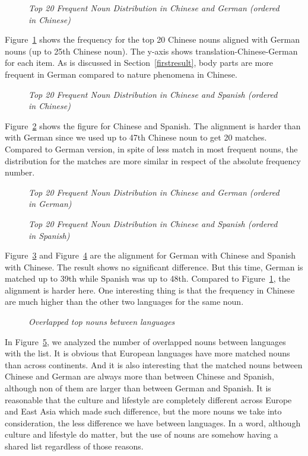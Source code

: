\begin{figure}[h]
\centerline{}
\caption{{\it Top 20 Frequent Noun Distribution in Chinese and German (ordered in Chinese)}}
\label{fig1}
\end{figure}

Figure~\ref{fig1} shows the frequency for the top 20 Chinese nouns aligned with German nouns (up to 25th Chinese noun). The y-axis shows translation-Chinese-German for each item. As is discussed in Section~\ref{firstresult}, body parts are more frequent in German compared to nature phenomena in Chinese. 

\begin{figure}[h]
\centerline{}
\caption{{\it Top 20 Frequent Noun Distribution in Chinese and Spanish (ordered in Chinese)}}
\label{fig2}
\end{figure}

Figure~\ref{fig2} shows the figure for Chinese and Spanish. The alignment is harder than with German since we used up to 47th Chinese noun to get 20 matches. Compared to German version, in spite of less match in most frequent nouns, the distribution for the matches are more similar in respect of the absolute frequency number. 

\begin{figure}[h]
\centerline{}
\caption{{\it Top 20 Frequent Noun Distribution in Chinese and German (ordered in German)}}
\label{fig3}
\end{figure}

\begin{figure}[h]
\centerline{}
\caption{{\it Top 20 Frequent Noun Distribution in Chinese and Spanish (ordered in Spanish)}}
\label{fig4}
\end{figure}

Figure~\ref{fig3} and Figure~\ref{fig4} are the alignment for German with Chinese and Spanish with Chinese. The result shows no significant difference. But this time, German is matched up to 39th while Spanish was up to 48th. Compared to Figure~\ref{fig1}, the alignment is harder here. One interesting thing is that the frequency in Chinese are much higher than the other two languages for the same noun. 

\begin{figure}[t]
\centerline{}
\caption{{\it Overlapped top nouns between languages}}
\label{fig5}
\end{figure}

In Figure~\ref{fig5}, we analyzed the number of overlapped nouns between languages with the list. It is obvious that European languages have more matched nouns than across continents. And it is also interesting that the matched nouns between Chinese and German are always more than between Chinese and Spanish, although non of them are larger than between German and Spanish. It is reasonable that the culture and lifestyle are completely different across Europe and East Asia which made such difference, but the more nouns we take into consideration, the less difference we have between languages. In a word, although culture and lifestyle do matter, but the use of nouns are somehow having a shared list regardless of those reasons. 